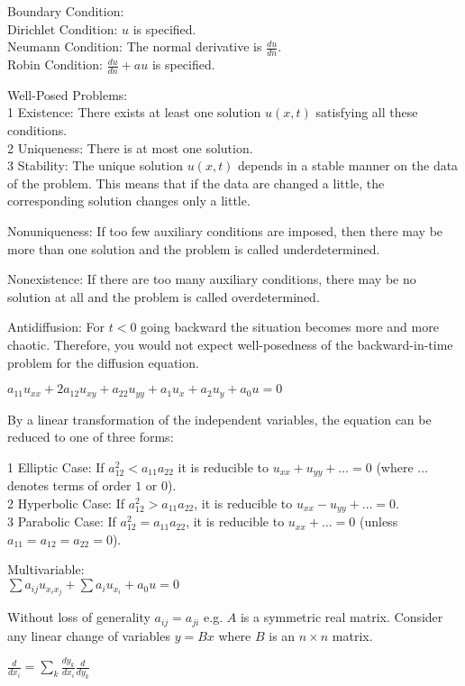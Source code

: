 Boundary Condition: \\
Dirichlet Condition: $u$ is specified. \\
Neumann Condition: The normal derivative is $\frac{du}{dn}$. \\
Robin Condition: $\frac{du}{dn}+au$ is specified.

Well-Posed Problems: \\
1 Existence: There exists at least one solution $u(x,t)$ satisfying all these conditions. \\
2 Uniqueness: There is at most one solution. \\
3 Stability: The unique solution $u(x,t)$ depends in a stable manner on the data of the problem. This means that if the data are changed a little, the corresponding solution changes only a little.

Nonuniqueness: If too few auxiliary conditions are imposed, then there may be more than one solution and the problem is called underdetermined.

Nonexistence: If there are too many auxiliary conditions, there may be no solution at all and the problem is called overdetermined.

Antidiffusion: For $t<0$ going backward the situation becomes more and more chaotic. Therefore, you would not expect well-posedness of the backward-in-time problem for the diffusion equation.

$a_{11} u_{xx}+2a_{12} u_{xy}+a_{22} u_{yy}+a_1 u_{x}+a_2 u_{y}+a_0 u=0$

By a linear transformation of the independent variables, the equation can be reduced to one of three forms:

1 Elliptic Case: If $a_{12}^2 < a_{11} a_{22}$ it is reducible to $u_{xx}+u_{yy}+\dots =0$ (where $\dots$ denotes terms of order $1$ or $0$). \\
2 Hyperbolic Case: If $a_{12}^2 > a_{11} a_{22}$, it is reducible to $u_{xx}-u_{yy}+\dots =0$. \\
3 Parabolic Case: If $a_{12}^2 = a_{11} a_{22}$, it is reducible to $u_{xx}+\dots =0$ (unless $a_{11}=a_{12}=a_{22}=0$).

Multivariable: \\
$\sum a_{ij} u_{x_i x_j} + \sum a_i u_{x_i} + a_0 u = 0$

Without loss of generality $a_{ij}=a_{ji}$ e.g. $A$ is a symmetric real matrix. Consider any linear change of variables $y=Bx$ where $B$ is an $n \times n$ matrix.

$\frac{d}{dx_i}=\sum_k \frac{dy_k}{dx_i} \frac{d}{dy_k}$

